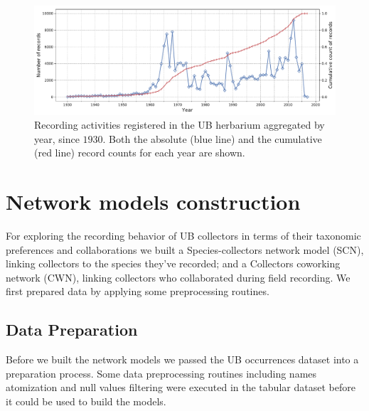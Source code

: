   \begin{figure}[h!]
  	\centering
    \includegraphics[width=\linewidth]{figures/casestudy_ub/ub_records_timeseries.pdf}
    \caption{Recording activities registered in the UB herbarium aggregated by year, since $1930$. Both the absolute (blue line) and the cumulative (red line) record counts for each year are shown.}
    \label{fig:ub_records_timeseries}
  \end{figure}









\section{Network models construction}



For exploring the recording behavior of UB collectors in terms of their taxonomic preferences and collaborations we built a Species-collectors network model (SCN), linking collectors to the species they've recorded; and a Collectors coworking network (CWN), linking collectors who collaborated during field recording.
We first prepared data by applying some preprocessing routines.

\subsection{Data Preparation} \label{section:ub_data_preparation}
Before we built the network models we passed the UB occurrences dataset into a preparation process.
Some data preprocessing routines including names atomization and null values filtering were executed in the tabular dataset before it could be used to build the models. 


